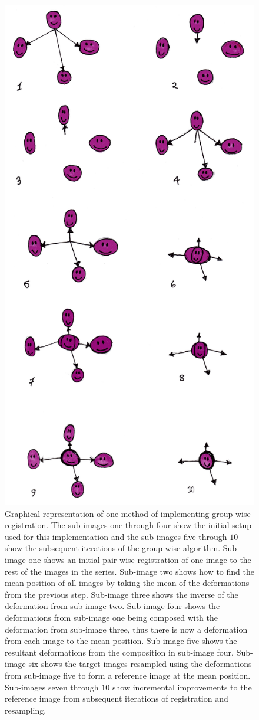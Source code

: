             \begin{figure}
                \centering
                        
                \includegraphics[width=0.5\linewidth]{figures/background_applying_image_registration_groupwise_breakdown.png}
                        
                \captionsetup{singlelinecheck=false, justification=raggedright}
                \caption{Graphical representation of one method of implementing group-wise registration. The sub-images one through four show the initial setup used for this implementation and the sub-images five through $10$ show the subsequent iterations of the group-wise algorithm. Sub-image one shows an initial pair-wise registration of one image to the rest of the images in the series. Sub-image two shows how to find the mean position of all images by taking the mean of the deformations from the previous step. Sub-image three shows the inverse of the deformation from sub-image two. Sub-image four shows the deformations from sub-image one being composed with the deformation from sub-image three, thus there is now a deformation from each image to the mean position. Sub-image five shows the resultant deformations from the composition in sub-image four. Sub-image six shows the target images resampled using the deformations from sub-image five to form a reference image at the mean position. Sub-images seven through $10$ show incremental improvements to the reference image from subsequent iterations of registration and resampling.} \label{fig:applying_image_registration_group-wise_breakdown}
            \end{figure}
            
